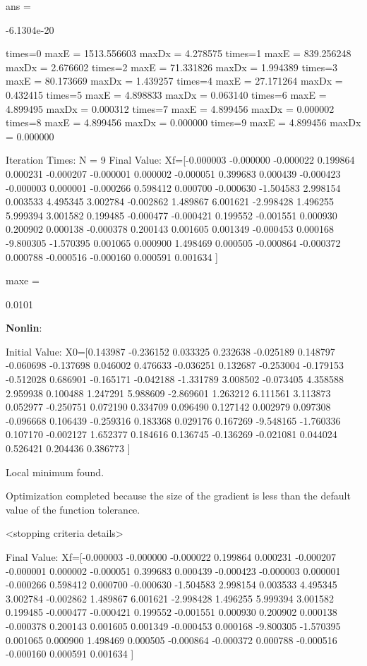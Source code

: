 \documentclass[12pt]{article}   %
\begin{document}
ans =

  -6.1304e-20

times=0 maxE = 1513.556603 maxDx = 4.278575
times=1 maxE = 839.256248 maxDx = 2.676602
times=2 maxE = 71.331826 maxDx = 1.994389
times=3 maxE = 80.173669 maxDx = 1.439257
times=4 maxE = 27.171264 maxDx = 0.432415
times=5 maxE = 4.898833 maxDx = 0.063140
times=6 maxE = 4.899495 maxDx = 0.000312
times=7 maxE = 4.899456 maxDx = 0.000002
times=8 maxE = 4.899456 maxDx = 0.000000
times=9 maxE = 4.899456 maxDx = 0.000000

Iteration Times:
	 N = 9
Final Value:
	 Xf=[-0.000003 -0.000000 -0.000022 0.199864 0.000231 -0.000207 -0.000001 0.000002 -0.000051 0.399683 0.000439 -0.000423 -0.000003 0.000001 -0.000266 0.598412 0.000700 -0.000630 -1.504583 2.998154 0.003533 4.495345 3.002784 -0.002862 1.489867 6.001621 -2.998428 1.496255 5.999394 3.001582 0.199485 -0.000477 -0.000421 0.199552 -0.001551 0.000930 0.200902 0.000138 -0.000378 0.200143 0.001605 0.001349 -0.000453 0.000168 -9.800305 -1.570395 0.001065 0.000900 1.498469 0.000505 -0.000864 -0.000372 0.000788 -0.000516 -0.000160 0.000591 0.001634 ]

maxe =

    0.0101
	
\bigskip

\textbf{Nonlin}:

Initial Value:
	 X0=[0.143987 -0.236152 0.033325 0.232638 -0.025189 0.148797 -0.060698 -0.137698 0.046002 0.476633 -0.036251 0.132687 -0.253004 -0.179153 -0.512028 0.686901 -0.165171 -0.042188 -1.331789 3.008502 -0.073405 4.358588 2.959938 0.100488 1.247291 5.988609 -2.869601 1.263212 6.111561 3.113873 0.052977 -0.250751 0.072190 0.334709 0.096490 0.127142 0.002979 0.097308 -0.096668 0.106439 -0.259316 0.183368 0.029176 0.167269 -9.548165 -1.760336 0.107170 -0.002127 1.652377 0.184616 0.136745 -0.136269 -0.021081 0.044024 0.526421 0.204436 0.386773 ]

Local minimum found.

Optimization completed because the size of the gradient is less than
the default value of the function tolerance.

<stopping criteria details>

Final Value:
	 Xf=[-0.000003 -0.000000 -0.000022 0.199864 0.000231 -0.000207 -0.000001 0.000002 -0.000051 0.399683 0.000439 -0.000423 -0.000003 0.000001 -0.000266 0.598412 0.000700 -0.000630 -1.504583 2.998154 0.003533 4.495345 3.002784 -0.002862 1.489867 6.001621 -2.998428 1.496255 5.999394 3.001582 0.199485 -0.000477 -0.000421 0.199552 -0.001551 0.000930 0.200902 0.000138 -0.000378 0.200143 0.001605 0.001349 -0.000453 0.000168 -9.800305 -1.570395 0.001065 0.000900 1.498469 0.000505 -0.000864 -0.000372 0.000788 -0.000516 -0.000160 0.000591 0.001634 ]
\end{document}
